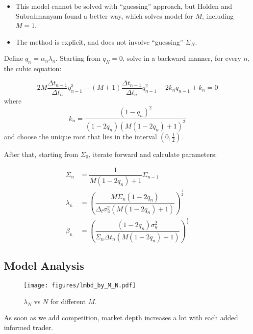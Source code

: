 \documentclass{beamer}
\begin{document}
\begin{frame}
    \begin{itemize}
        \item This model cannot be solved with ``guessing'' approach, but Holden and Subrahmanyam found a better way, which solves model for $M$, including $M=1$.
        \item The method is explicit, and does not involve ``guessing'' $\Sigma_N$.
    \end{itemize}
\end{frame}

\begin{frame}
    Define $q_n = \alpha_n\lambda_n$. Starting from $q_N = 0$, solve in a backward manner, for every $n$, the cubic equation:

    \begin{equation}
        2M\dfrac{\Delta t_{n-1}}{\Delta t_n} q_{n-1}^3 - (M+1)\dfrac{\Delta t_{n-1}}{\Delta t_n}q_{n-1}^2 - 2k_n q_{n-1} + k_n= 0
    \end{equation}
    where
    \begin{equation}
        k_n = \dfrac{(1-q_n)^2}{(1 - 2q_n)(M(1-2q_n) + 1)^2}
    \end{equation}
    and choose the unique root that lies in the interval $(0, \frac{1}{2})$.
\end{frame}

\begin{frame}
    After that, starting from $\Sigma_0$, iterate forward and calculate parameters:

    \begin{align}
        \Sigma_n &= \dfrac{1}{M(1 - 2q_n) + 1}\Sigma_{n-1} \\
        \lambda_n &= \left(\dfrac{M\Sigma_n(1-2q_n)}{\Delta_t \sigma_u^2 (M(1-2q_n) + 1)}\right)^{\frac{1}{2}} \\
        \beta_n &= \left(\dfrac{(1-2q_n)\sigma_u^2}{\Sigma_n\Delta t_n (M(1-2q_n) + 1)}\right)^{\frac{1}{2}}
    \end{align}

\end{frame}

\subsection{Model Analysis}

\begin{frame}
    \begin{figure}\label{fig:lambda_by_MN}
        \texttt{[image: figures/lmbd\_by\_M\_N.pdf]}
        \caption{$\lambda_N$ vs $N$ for different $M$.}
    \end{figure}

    As soon as we add competition, market depth increases a lot with each added informed trader.
\end{frame}
\end{document}

